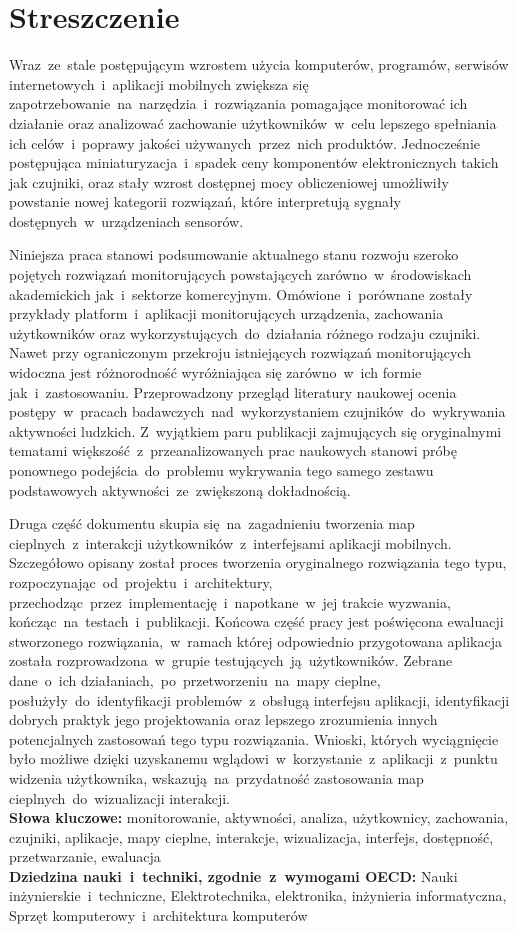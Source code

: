 \chapter*{Streszczenie}
Wraz~ze~stale postępującym wzrostem użycia komputerów, programów, serwisów internetowych~i~aplikacji mobilnych zwiększa się zapotrzebowanie~na~narzędzia~i~rozwiązania pomagające monitorować ich działanie oraz analizować zachowanie użytkowników~w~celu lepszego spełniania ich celów~i~poprawy jakości używanych~przez~nich produktów. Jednocześnie postępująca miniaturyzacja~i~spadek ceny komponentów elektronicznych takich jak czujniki, oraz stały wzrost dostępnej mocy obliczeniowej umożliwiły powstanie nowej kategorii rozwiązań, które interpretują sygnały dostępnych~w~urządzeniach sensorów. 

Niniejsza praca stanowi podsumowanie aktualnego stanu rozwoju szeroko pojętych rozwiązań monitorujących powstających zarówno~w~środowiskach akademickich jak~i~sektorze komercyjnym. Omówione~i~porównane zostały przykłady platform~i~aplikacji monitorujących urządzenia, zachowania użytkowników oraz wykorzystujących~do~działania różnego rodzaju czujniki. Nawet przy ograniczonym przekroju istniejących rozwiązań monitorujących widoczna jest różnorodność wyróżniająca się zarówno~w~ich formie jak~i~zastosowaniu. Przeprowadzony przegląd literatury naukowej ocenia postępy~w~pracach badawczych~nad~wykorzystaniem czujników~do~wykrywania aktywności ludzkich. Z~wyjątkiem paru publikacji zajmujących się oryginalnymi tematami większość~z~przeanalizowanych prac naukowych stanowi próbę ponownego podejścia~do~problemu wykrywania tego samego zestawu podstawowych aktywności~ze~zwiększoną dokładnością. 

Druga część dokumentu skupia się~na~zagadnieniu tworzenia map cieplnych~z~interakcji użytkowników~z~interfejsami aplikacji mobilnych. Szczegółowo opisany został proces tworzenia oryginalnego rozwiązania tego typu, rozpoczynając~od~projektu~i~architektury, przechodząc~przez~implementację~i~napotkane~w~jej trakcie wyzwania, kończąc~na~testach~i~publikacji. Końcowa część pracy jest poświęcona ewaluacji stworzonego rozwiązania,~w~ramach której odpowiednio przygotowana aplikacja została rozprowadzona~w~grupie testujących~ją~użytkowników. Zebrane dane~o~ich działaniach,~po~przetworzeniu~na~mapy cieplne, posłużyły~do~identyfikacji problemów~z~obsługą interfejsu aplikacji, identyfikacji dobrych praktyk jego projektowania oraz lepszego zrozumienia innych potencjalnych zastosowań tego typu rozwiązania. Wnioski, których wyciągnięcie było możliwe dzięki uzyskanemu wglądowi~w~korzystanie~z~aplikacji~z~punktu widzenia użytkownika, wskazują~na~przydatność zastosowania map cieplnych~do~wizualizacji interakcji. \\

\noindent\textbf{Słowa kluczowe:} monitorowanie, aktywności, analiza, użytkownicy, zachowania, czujniki, aplikacje, mapy cieplne, interakcje, wizualizacja, interfejs, dostępność, przetwarzanie, ewaluacja \\

\noindent\textbf{Dziedzina nauki~i~techniki, zgodnie~z~wymogami OECD:} Nauki inżynierskie~i~techniczne, Elektrotechnika, elektronika, inżynieria informatyczna, Sprzęt komputerowy~i~architektura komputerów
